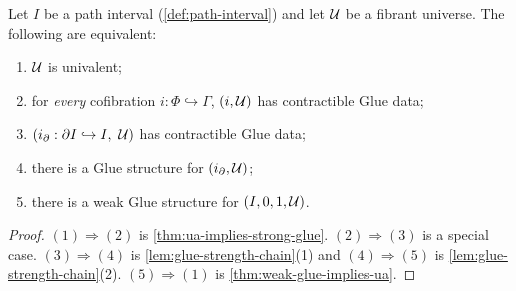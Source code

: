 \begin{theorem}\label{thm:glue-sandwich}
	Let $I$ be a path interval (\cref{def:path-interval}) and let
	$\mathcal{U}$ be a fibrant universe. The following are equivalent:
	\begin{enumerate}[noitemsep]
		\item $\mathcal{U}$ is univalent;
		\item for \emph{every} cofibration $i:\Phi\hookrightarrow\Gamma$,
		$(i,\mathcal{U})$ has contractible Glue data;
		\item $(i_\partial:\partial I\hookrightarrow I,\ \mathcal{U})$ has contractible
		Glue data;
		\item there is a Glue structure for $(i_\partial,\mathcal{U})$;
		\item there is a weak Glue structure for $(I,0,1,\mathcal{U})$.
	\end{enumerate}
\end{theorem}
\begin{proof}
	$(1)\Rightarrow(2)$ is \cref{thm:ua-implies-strong-glue}.
	$(2)\Rightarrow(3)$ is a special case.
	$(3)\Rightarrow(4)$ is \cref{lem:glue-strength-chain}(1) and
	$(4)\Rightarrow(5)$ is \cref{lem:glue-strength-chain}(2).
	$(5)\Rightarrow(1)$ is \cref{thm:weak-glue-implies-ua}.
\end{proof}


